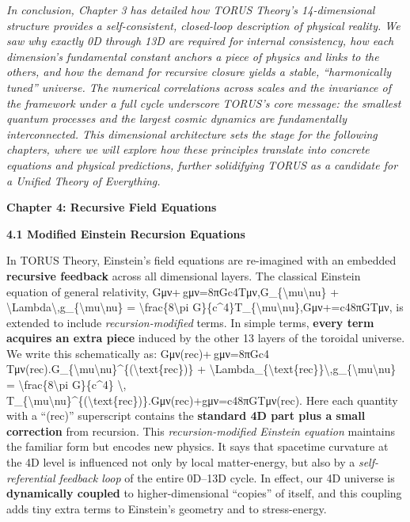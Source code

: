 \documentclass[
]{article}
\begin{document}
\emph{In conclusion, Chapter 3 has detailed how TORUS Theory's
14-dimensional structure provides a self-consistent, closed-loop
description of physical reality. We saw why exactly 0D through 13D are
required for internal consistency, how each dimension's fundamental
constant anchors a piece of physics and links to the others, and how the
demand for recursive closure yields a stable, ``harmonically tuned''
universe. The numerical correlations across scales and the invariance of
the framework under a full cycle underscore TORUS's core message: the
smallest quantum processes and the largest cosmic dynamics are
fundamentally interconnected. This dimensional architecture sets the
stage for the following chapters, where we will explore how these
principles translate into concrete equations and physical predictions,
further solidifying TORUS as a candidate for a Unified Theory of
Everything.}

\textbf{Chapter 4: Recursive Field Equations}

\textbf{4.1 Modified Einstein Recursion Equations}

In TORUS Theory, Einstein's field equations are re-imagined with an
embedded \textbf{recursive feedback} across all dimensional layers. The
classical Einstein equation of general relativity,
Gμν+\Lambda gμν=8πGc4Tμν,G\_\{\textbackslash mu\textbackslash nu\} +
\textbackslash Lambda\textbackslash,g\_\{\textbackslash mu\textbackslash nu\}
= \textbackslash frac\{8\textbackslash pi
G\}\{c\^{}4\}T\_\{\textbackslash mu\textbackslash nu\},Gμν\hspace{0pt}+\hspace{0pt}=c48πG\hspace{0pt}Tμν\hspace{0pt},
is extended to include \emph{recursion-modified} terms. In simple terms,
\textbf{every term acquires an extra piece} induced by the other 13
layers of the toroidal universe. We write this schematically as:
Gμν(rec)+\Lambdarec gμν=8πGc4 Tμν(rec).G\_\{\textbackslash mu\textbackslash nu\}\^{}\{(\textbackslash text\{rec\})\}
+
\textbackslash Lambda\_\{\textbackslash text\{rec\}\}\textbackslash,g\_\{\textbackslash mu\textbackslash nu\}
= \textbackslash frac\{8\textbackslash pi G\}\{c\^{}4\} \textbackslash,
T\_\{\textbackslash mu\textbackslash nu\}\^{}\{(\textbackslash text\{rec\})\}.Gμν(rec)\hspace{0pt}+\Lambdarec\hspace{0pt}gμν\hspace{0pt}=c48πG\hspace{0pt}Tμν(rec)\hspace{0pt}.
Here each quantity with a ``(rec)'' superscript contains the
\textbf{standard 4D part plus a small correction} from recursion. This
\emph{recursion-modified Einstein equation} maintains the familiar form
but encodes new physics. It says that spacetime curvature at the 4D
level is influenced not only by local matter-energy, but also by a
\emph{self-referential feedback loop} of the entire 0D--13D
cycle\hspace{0pt}. In effect, our 4D universe is \textbf{dynamically
coupled} to higher-dimensional ``copies'' of itself, and this coupling
adds tiny extra terms to Einstein's geometry and to stress-energy.
\end{document}
